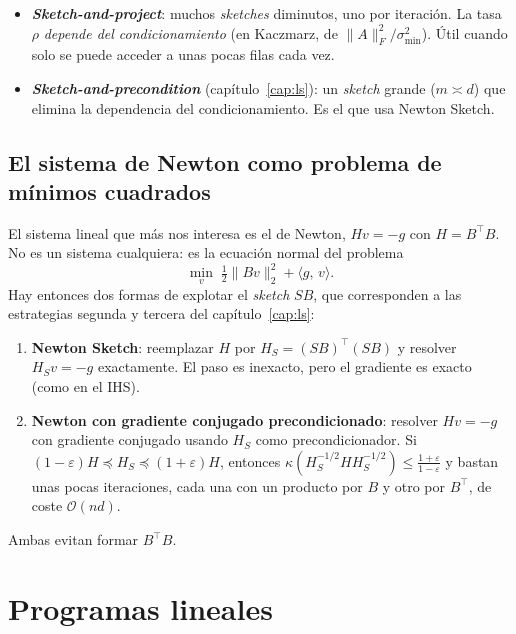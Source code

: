 \documentclass[11pt,a4paper,oneside]{book}
\theoremstyle{definition}
\theoremstyle{remark}
\newcommand{\cO}{\mathcal{O}}
\newcommand{\T}{^{\top}}
\newcommand{\eps}{\varepsilon}
\newcommand{\nrm}[1]{\lVert #1\rVert}
\newcommand{\ip}[2]{\langle #1,\, #2\rangle}
\begin{document}
\begin{cuidado}
\begin{itemize}
  \item \textbf{\emph{Sketch-and-project}}: muchos \emph{sketches} diminutos, uno por iteración. La tasa $\rho$
        \emph{depende del condicionamiento} (en Kaczmarz, de $\nrm{A}_F^2/\sigma_{\min}^2$). Útil cuando solo se puede acceder a unas pocas filas cada vez.
  \item \textbf{\emph{Sketch-and-precondition}} (capítulo~\ref{cap:ls}): un \emph{sketch} grande ($m\asymp d$) que
        elimina la dependencia del condicionamiento. Es el que usa Newton Sketch.
\end{itemize}
\end{cuidado}

\subsection{El sistema de Newton como problema de mínimos cuadrados}

El sistema lineal que más nos interesa es el de Newton, $H v=-g$ con $H=B\T B$. No es un sistema cualquiera:
es la ecuación normal del problema
\[ \min_{v}\;\tfrac12\nrm{Bv}_2^2+\ip{g}{v} . \]
Hay entonces dos formas de explotar el \emph{sketch} $SB$, que corresponden a las estrategias segunda y
tercera del capítulo~\ref{cap:ls}:
\begin{enumerate}
  \item \textbf{Newton Sketch}: reemplazar $H$ por $H_S=(SB)\T(SB)$ y resolver $H_Sv=-g$ exactamente. El paso es
        inexacto, pero el gradiente es exacto (como en el IHS).
  \item \textbf{Newton con gradiente conjugado precondicionado}: resolver $Hv=-g$ con gradiente conjugado usando $H_S$
        como precondicionador. Si $(1-\eps)H\preceq H_S\preceq(1+\eps)H$, entonces
        $\kappa(H_S^{-1/2}HH_S^{-1/2})\le\frac{1+\eps}{1-\eps}$ y bastan unas pocas iteraciones, cada una con un producto
        por $B$ y otro por $B\T$, de coste $\cO(nd)$.
\end{enumerate}
Ambas evitan formar $B\T B$.

\section{Programas lineales}\label{sec:pl}
\end{document}
